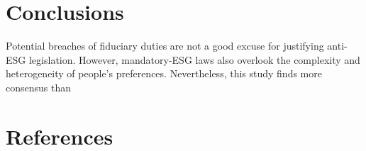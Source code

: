 \documentclass[
  12pt,
]{article}
\begin{document}
\hypertarget{conclusions}{%
\section{Conclusions}\label{conclusions}}

Potential breaches of fiduciary duties are not a good excuse for justifying anti-ESG legislation. However, mandatory-ESG laws also overlook the complexity and heterogeneity of people's preferences. Nevertheless, this study finds more consensus than

\hypertarget{references}{%
\section*{References}\label{references}}
\end{document}
